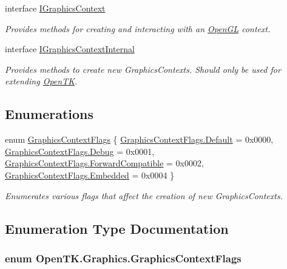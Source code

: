 \begin{DoxyCompactItemize}
interface \hyperlink{interface_open_t_k_1_1_graphics_1_1_i_graphics_context}{I\-Graphics\-Context}
\begin{DoxyCompactList}\small\item\em Provides methods for creating and interacting with an \hyperlink{namespace_open_t_k_1_1_graphics_1_1_open_g_l}{Open\-G\-L} context. \end{DoxyCompactList}\item 
interface \hyperlink{interface_open_t_k_1_1_graphics_1_1_i_graphics_context_internal}{I\-Graphics\-Context\-Internal}
\begin{DoxyCompactList}\small\item\em Provides methods to create new Graphics\-Contexts. Should only be used for extending \hyperlink{namespace_open_t_k}{Open\-T\-K}. \end{DoxyCompactList}\end{DoxyCompactItemize}
\subsection*{Enumerations}
\begin{DoxyCompactItemize}
\item 
enum \hyperlink{namespace_open_t_k_1_1_graphics_a518f77952bc406a013160356981ea8ab}{Graphics\-Context\-Flags} \{ \hyperlink{namespace_open_t_k_1_1_graphics_a518f77952bc406a013160356981ea8aba7a1920d61156abc05a60135aefe8bc67}{Graphics\-Context\-Flags.\-Default} = 0x0000, 
\hyperlink{namespace_open_t_k_1_1_graphics_a518f77952bc406a013160356981ea8abaa603905470e2a5b8c13e96b579ef0dba}{Graphics\-Context\-Flags.\-Debug} = 0x0001, 
\hyperlink{namespace_open_t_k_1_1_graphics_a518f77952bc406a013160356981ea8aba90b21fdee9b0f1e07fec562556052bab}{Graphics\-Context\-Flags.\-Forward\-Compatible} = 0x0002, 
\hyperlink{namespace_open_t_k_1_1_graphics_a518f77952bc406a013160356981ea8aba069e7821d3b4c0bbf437147263eb4d0e}{Graphics\-Context\-Flags.\-Embedded} = 0x0004
 \}
\begin{DoxyCompactList}\small\item\em Enumerates various flags that affect the creation of new Graphics\-Contexts. \end{DoxyCompactList}\end{DoxyCompactItemize}


\subsection{Enumeration Type Documentation}
\hypertarget{namespace_open_t_k_1_1_graphics_a518f77952bc406a013160356981ea8ab}{
\subsubsection[{Graphics\-Context\-Flags}]{\setlength{\rightskip}{0pt plus 5cm}enum {\bf Open\-T\-K.\-Graphics.\-Graphics\-Context\-Flags}}}\label{namespace_open_t_k_1_1_graphics_a518f77952bc406a013160356981ea8ab}


